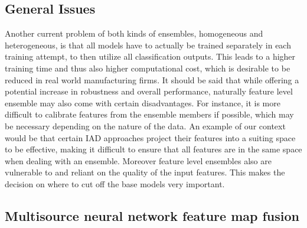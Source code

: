 \subsection{General Issues}

Another current problem of both kinds of ensembles, homogeneous and heterogeneous, is that all models have to actually be trained 
separately in each training attempt, to then utilize all classification outputs. This leads to a higher training time and thus also higher computational 
cost, which is desirable to be reduced in real world manufacturing firms.
It should be said that while offering a potential increase in robustness and overall performance, naturally feature level ensemble may also 
come with certain disadvantages. For instance, it is more difficult to calibrate features from the ensemble members if possible, which may 
be necessary depending on the nature of the data. An example of our context would be that certain IAD approaches project their features into a 
suiting space to be effective, making it difficult to ensure that all features are in the same space when dealing with an ensemble. 
Moreover feature level ensembles also are vulnerable to and reliant on the quality of the input features. This makes the decision on where 
to cut off the base models very important.

\subsection{Multisource neural network feature map fusion}

